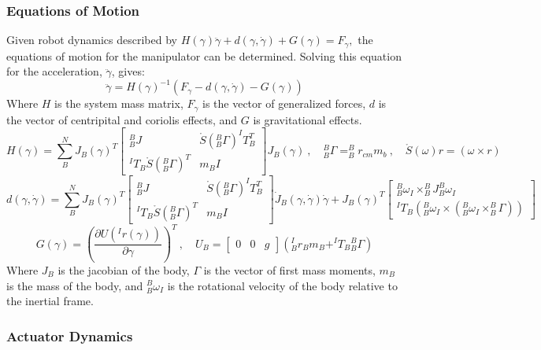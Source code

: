 \subsubsection*{Equations of Motion}
Given robot dynamics described by \(H(\gamma) \ddot{\gamma}+d(\gamma, \dot{\gamma})+G(\gamma)=F_{\gamma},\) the equations of motion for
the manipulator can be determined. Solving this equation for the acceleration, \(\ddot{\gamma}\), gives:
\begin{equation}
  \ddot{\gamma}=H(\gamma)^{-1}\left(F_{\gamma}-d(\gamma, \dot{\gamma})-G(\gamma)\right)
  \label{eq:eoms}
\end{equation}
Where $H$ is the system mass matrix, $F_{\gamma}$ is the vector of generalized forces, $d$ is the vector of centripital and coriolis effects, and $G$ is gravitational effects.
\[
  \renewcommand{\arraystretch}{1.5}
  H(\gamma) = \sum_B^N J_B(\gamma)^T
  \begin{bmatrix}
    ^B_BJ & \mathring{S}(^B_B\Gamma) ^IT_B^T\\
    ^IT_B\mathring{S}(^B_B\Gamma)^T & m_BI
  \end{bmatrix}
  J_B(\gamma)~,\quad
  ^B_B\Gamma = ^B_Br_{cm}m_b~,\quad \mathring{S}(\omega)r=(\omega\times r)
\]
\[
  \renewcommand{\arraystretch}{1.5}
  d(\gamma,\dot{\gamma}) = \sum_B^N J_B(\gamma)^T
  \begin{bmatrix}
    ^B_BJ & \mathring{S}(^B_B\Gamma) ^IT_B^T\\
    ^IT_B\mathring{S}(^B_B\Gamma)^T & m_BI
  \end{bmatrix}
  \dot{J}_B(\gamma,\dot{\gamma})\dot{\gamma}+J_B(\gamma)^T
  \begin{bmatrix}
    ^B_B\omega_I \times ^B_BJ ^B_B\omega_I \\
    ^IT_B\left(^B_B\omega_I\times(^B_B\omega_I\times^B_B\Gamma)\right)
  \end{bmatrix}
\]
\[
G(\gamma) = \left(\frac{\partial U(^Ir(\gamma))}{\partial\gamma}\right)^T~,\quad U_B = \begin{bmatrix} 0 & 0 & g\end{bmatrix}\left(^I_Br_Bm_B + ^IT_B{}_B^B\Gamma\right)
\]
Where $J_B$ is the jacobian of the body, $\Gamma$ is the vector of first mass moments, $m_B$ is the mass of the body, and $^B_B\omega_I$ is the rotational velocity of the body relative to the inertial frame.
\subsubsection*{Actuator Dynamics}


